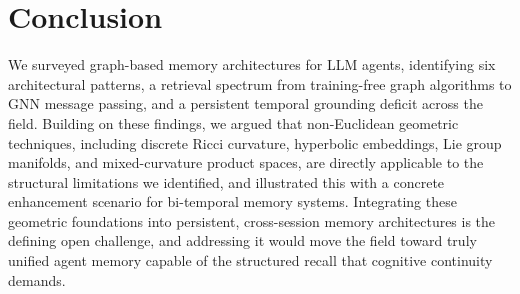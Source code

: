 \documentclass[hf]{ceurart}
\begin{document}
\section{Conclusion}
\label{sec:conclusion}

We surveyed graph-based memory architectures for LLM agents,
identifying six architectural patterns, a retrieval spectrum from
training-free graph algorithms to GNN message passing, and a
persistent temporal grounding deficit across the field. Building on
these findings, we argued that non-Euclidean geometric
techniques, including discrete Ricci curvature, hyperbolic embeddings, Lie
group manifolds, and mixed-curvature product spaces, are directly
applicable to the structural limitations we identified, and
illustrated this with a concrete enhancement scenario for
bi-temporal memory systems. Integrating these geometric foundations
into persistent, cross-session memory architectures is the defining
open challenge, and addressing it would move the field toward truly
unified agent memory capable of the structured recall that cognitive
continuity demands.
\end{document}
